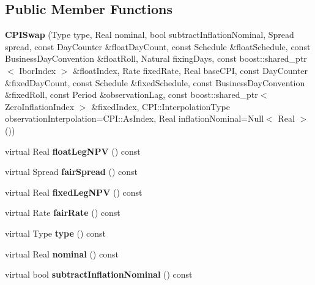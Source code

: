\subsection*{Public Member Functions}
\begin{DoxyCompactItemize}
\item 
{\bfseries C\+P\+I\+Swap} (Type type, Real nominal, bool subtract\+Inflation\+Nominal, Spread spread, const Day\+Counter \&float\+Day\+Count, const Schedule \&float\+Schedule, const Business\+Day\+Convention \&float\+Roll, Natural fixing\+Days, const boost\+::shared\+\_\+ptr$<$ Ibor\+Index $>$ \&float\+Index, Rate fixed\+Rate, Real base\+C\+PI, const Day\+Counter \&fixed\+Day\+Count, const Schedule \&fixed\+Schedule, const Business\+Day\+Convention \&fixed\+Roll, const Period \&observation\+Lag, const boost\+::shared\+\_\+ptr$<$ Zero\+Inflation\+Index $>$ \&fixed\+Index, C\+P\+I\+::\+Interpolation\+Type observation\+Interpolation=C\+P\+I\+::\+As\+Index, Real inflation\+Nominal=Null$<$ Real $>$())\label{class_quant_lib_1_1_c_p_i_swap_aeabcb3e4f9390db2840f8945cc07beda}

\item 
virtual Real {\bfseries float\+Leg\+N\+PV} () const \label{class_quant_lib_1_1_c_p_i_swap_a67a8b2e6af69d77aa20bc2f278fabd8a}

\item 
virtual Spread {\bfseries fair\+Spread} () const \label{class_quant_lib_1_1_c_p_i_swap_a13bc909ffa3da3552190bbf811053bfa}

\item 
virtual Real {\bfseries fixed\+Leg\+N\+PV} () const \label{class_quant_lib_1_1_c_p_i_swap_a8d750f11462fdead6cf0cc245bdf7d05}

\item 
virtual Rate {\bfseries fair\+Rate} () const \label{class_quant_lib_1_1_c_p_i_swap_a04fc555bfd0d786e961d74fbdeeb7d4a}

\item 
virtual Type {\bfseries type} () const \label{class_quant_lib_1_1_c_p_i_swap_a86e6f0f43a4c1add02c69cde3ccbe40c}

\item 
virtual Real {\bfseries nominal} () const \label{class_quant_lib_1_1_c_p_i_swap_a0272317e8721c4a1d6d77e6a02256f09}

\item 
virtual bool {\bfseries subtract\+Inflation\+Nominal} () const \label{class_quant_lib_1_1_c_p_i_swap_a1f939e2ee24b2c3c41f398e86812334a}


\end{DoxyCompactItemize}
